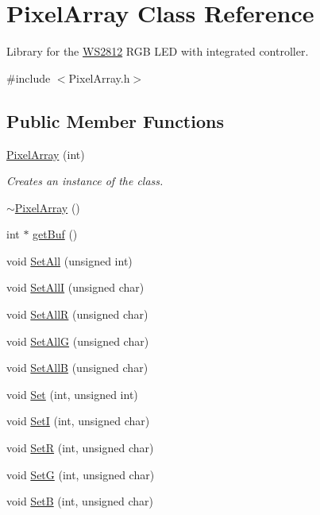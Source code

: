 \hypertarget{class_pixel_array}{}\section{Pixel\+Array Class Reference}
\label{class_pixel_array}


Library for the \hyperlink{class_w_s2812}{W\+S2812} R\+GB L\+ED with integrated controller.  




{\ttfamily \#include $<$Pixel\+Array.\+h$>$}

\subsection*{Public Member Functions}
\begin{DoxyCompactItemize}
\item 
\hyperlink{class_pixel_array_a86359f5eda90e0d12e3aa2c102ade21d}{Pixel\+Array} (int)
\begin{DoxyCompactList}\small\item\em Creates an instance of the class. \end{DoxyCompactList}\item 
\hyperlink{class_pixel_array_a9f4d10fcbd08290dfdecafb2ed4ad687}{$\sim$\+Pixel\+Array} ()
\item 
int $\ast$ \hyperlink{class_pixel_array_a987f1dc053a5cf25d78d5cfe037088d3}{get\+Buf} ()
\item 
void \hyperlink{class_pixel_array_a5f560dcef3d1582614858969b20da89d}{Set\+All} (unsigned int)
\item 
void \hyperlink{class_pixel_array_a9433e281c3cc0e4f8bbf23e127d8ad2c}{Set\+AllI} (unsigned char)
\item 
void \hyperlink{class_pixel_array_a9ddfdd1a01a9877e4bfcf5a462412fd2}{Set\+AllR} (unsigned char)
\item 
void \hyperlink{class_pixel_array_a88f25ee1b266e2dc0ef7ae90ff4bd12d}{Set\+AllG} (unsigned char)
\item 
void \hyperlink{class_pixel_array_a3b17271fdc21503236ca6ca8e37d501b}{Set\+AllB} (unsigned char)
\item 
void \hyperlink{class_pixel_array_afcfe32b74beeced27f928f42131d77c1}{Set} (int, unsigned int)
\item 
void \hyperlink{class_pixel_array_afbfac74c674f63d793d85141d3a3b046}{SetI} (int, unsigned char)
\item 
void \hyperlink{class_pixel_array_abd4253e7c76f3775f31e09dfe318e3a5}{SetR} (int, unsigned char)
\item 
void \hyperlink{class_pixel_array_a60ea8084ec95df0d51f46c9b0ff308d5}{SetG} (int, unsigned char)
\item 
void \hyperlink{class_pixel_array_a560a654c59614fd5a6c17adb10083a78}{SetB} (int, unsigned char)
\end{DoxyCompactItemize}


